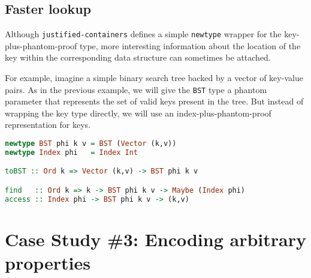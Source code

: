 \documentclass[format=sigplan, review=false, screen=true]{acmart}
\begin{document}
\subsection{Faster lookup}
Although \texttt{justified-containers} defines a simple \texttt{newtype} wrapper for
the key-plus-phantom-proof type, more interesting information about the location of
the key within the corresponding data structure can sometimes be attached.

For example, imagine a simple binary search tree backed by a vector of key-value pairs.
As in the previous example, we will give the \texttt{BST} type a phantom parameter that
represents the set of valid keys present in the tree. But instead of wrapping the key
type directly, we will use an index-plus-phantom-proof representation for keys.

\begin{lstlisting}[language=Haskell]
newtype BST phi k v = BST (Vector (k,v))
newtype Index phi   = Index Int

toBST :: Ord k => Vector (k,v) -> BST phi k v

find   :: Ord k => k -> BST phi k v -> Maybe (Index phi)
access :: Index phi -> BST phi k v -> (k,v)
\end{lstlisting}

\section{Case Study \#3: Encoding arbitrary properties}
\end{document}
